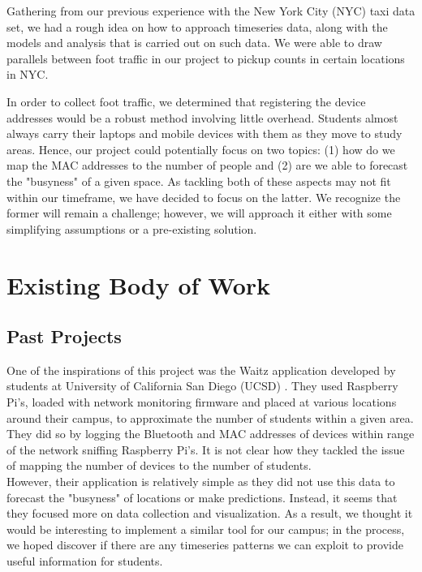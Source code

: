 \documentclass[journal, 12pt]{IEEEtran}
\begin{document}
\noindent Gathering from our previous experience with the New York City (NYC) taxi data set, we had a rough idea on how to approach timeseries data, along with the models and analysis that is carried out on such data. We were able to draw parallels between foot traffic in our project to pickup counts in certain locations in NYC.

\noindent In order to collect foot traffic, we determined that registering the device addresses would be a robust method involving little overhead. Students almost always carry their laptops and mobile devices with them as they move to study areas. Hence, our project could potentially focus on two topics: (1) how do we map the MAC addresses to the number of people and (2) are we able to forecast the "busyness" of a given space. As tackling both of these aspects may not fit within our timeframe, we have decided to focus on the latter. We recognize the former will remain a challenge; however, we will approach it either with some simplifying assumptions or a pre-existing solution.


\section{Existing Body of Work}
\subsection{Past Projects}
\noindent One of the inspirations of this project was the Waitz application developed by students at University of California San Diego (UCSD) \cite{waitz}. They used Raspberry Pi's, loaded with network monitoring firmware and placed at various locations around their campus, to approximate the number of students within a given area. They did so by logging the Bluetooth and MAC addresses of devices within range of the network sniffing Raspberry Pi's. It is not clear how they tackled the issue of mapping the number of devices to the number of students.\\


\noindent However, their application is relatively simple as they did not use this data to forecast the "busyness" of locations or make predictions. Instead, it seems that they focused more on data collection and visualization. As a result, we thought it would be interesting to implement a similar tool for our campus; in the process, we hoped discover if there are any timeseries patterns we can exploit to provide useful information for students.
\end{document}
